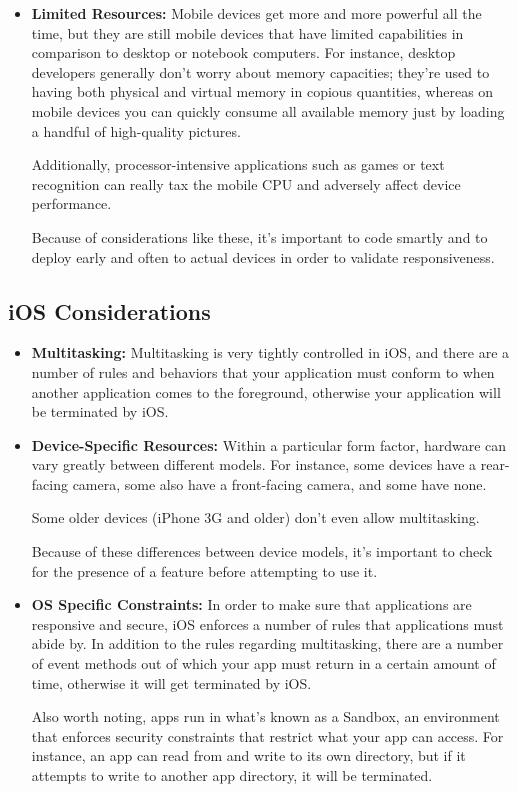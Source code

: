 \begin{itemize}
\item \textbf{Limited Resources: }
Mobile devices get more and more powerful all the time, but they are still mobile devices that have limited capabilities in comparison to desktop or notebook computers. For instance, desktop developers generally don’t worry about memory capacities; they’re used to having both physical and virtual memory in copious quantities, whereas on mobile devices you can quickly consume all available memory just by loading a handful of high-quality pictures.

Additionally, processor-intensive applications such as games or text recognition can really tax the mobile CPU and adversely affect device performance.

Because of considerations like these, it’s important to code smartly and to deploy early and often to actual devices in order to validate responsiveness.
\end{itemize}

\subsection{iOS Considerations}

\begin{itemize}
\item \textbf{Multitasking: }
Multitasking is very tightly controlled in iOS, and there are a number of rules and behaviors that your application must conform to when another application comes to the foreground, otherwise your application will be terminated by iOS.


\item \textbf{Device-Specific Resources:}
Within a particular form factor, hardware can vary greatly between different models. For instance, some devices have a rear-facing camera, some also have a front-facing camera, and some have none.

Some older devices (iPhone 3G and older) don’t even allow multitasking.

Because of these differences between device models, it’s important to check for the presence of a feature before attempting to use it.


\item \textbf{OS Specific Constraints:}
In order to make sure that applications are responsive and secure, iOS enforces a number of rules that applications must abide by. In addition to the rules regarding multitasking, there are a number of event methods out of which your app must return in a certain amount of time, otherwise it will get terminated by iOS.

Also worth noting, apps run in what’s known as a Sandbox, an environment that enforces security constraints that restrict what your app can access. For instance, an app can read from and write to its own directory, but if it attempts to write to another app directory, it will be terminated.

\end{itemize}

